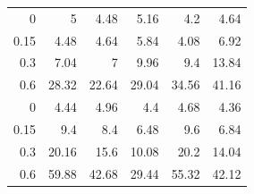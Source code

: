\begin{tabular}{rrrrrr}
0 & 5 & 4.48 & 5.16 & 4.2 & 4.64 \\
0.15 & 4.48 & 4.64 & 5.84 & 4.08 & 6.92 \\
0.3 & 7.04 & 7 & 9.96 & 9.4 & 13.84 \\
0.6 & 28.32 & 22.64 & 29.04 & 34.56 & 41.16 \\
0 & 4.44 & 4.96 & 4.4 & 4.68 & 4.36 \\
0.15 & 9.4 & 8.4 & 6.48 & 9.6 & 6.84 \\
0.3 & 20.16 & 15.6 & 10.08 & 20.2 & 14.04 \\
0.6 & 59.88 & 42.68 & 29.44 & 55.32 & 42.12 \\
\end{tabular}
